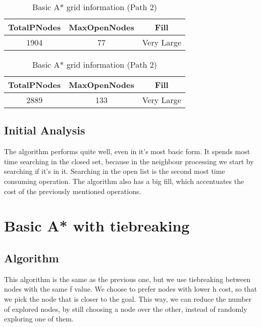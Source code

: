 \documentclass{article}
\begin{document}
  \begin{table}[h!]
    \parbox{.45\linewidth}{
        \centering
        \caption{Basic A* grid information (Path 1)}
        \label{tab:tableA*Grid1}
        \begin{tabular}{c|c|c}
          \textbf{TotalPNodes} & \textbf{MaxOpenNodes} & \textbf{Fill}\\
          \hline
          1904 & 77 & Very Large\\
        \end{tabular}
    }
    \hfil
    \parbox{.45\linewidth}{
        \centering
        \caption{Basic A* grid information (Path 2)}
        \label{tab:tableA*Grid2}
        \begin{tabular}{c|c|c}
          \textbf{TotalPNodes} & \textbf{MaxOpenNodes} & \textbf{Fill}\\
          \hline
          2889 & 133 & Very Large\\
        \end{tabular}
    }
  \end{table}
  \subsection{Initial Analysis}
  The algorithm performs quite well, even in it's most basic form. It spends most time searching in 
  the closed set, because in the neighbour processing we start by searching if it's in it. Searching 
  in the open list is the second most time consuming operation. The algorithm also has a big fill, 
  which accentuates the cost of the previously mentioned operations.\\

  \section{Basic A* with tiebreaking}
  \subsection{Algorithm}
  This algorithm is the same as the previous one, but we use tiebreaking between nodes with the same 
  f value. We choose to prefer nodes with lower h cost, so that we pick the node that is closer to the goal. 
  This way, we can reduce the number of explored nodes, by still choosing a node over the other, instead of randomly exploring one of them.\\
\end{document}
